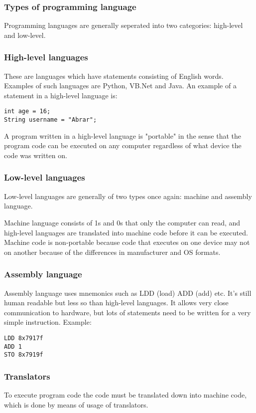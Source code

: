 \documentclass{article}
\begin{document}
\subsubsection{Types of programming language}
Programming languages are generally seperated into two categories: high-level and 
low-level.

\subsubsection*{High-level languages}
These are languages which have statements consisting of English words. Examples of such
languages are Python, VB.Net and Java. An example of a statement in a high-level language
is:
\begin{verbatim}
int age = 16;
String username = "Abrar";
\end{verbatim}
A program written in a high-level language is "portable" in the sense that the program
code can be executed on any computer regardless of what device the code was written on.

\subsubsection*{Low-level languages}
Low-level languages are generally of two types once again: machine and assembly language.

Machine language consists of 1s and 0s that only the computer can read, and high-level
languages are translated into machine code before it can be executed. Machine code is
non-portable because code that executes on one device may not on another because of the
differences in manufacturer and OS formats.

\subsubsection{Assembly language}
Assembly language uses mnemonics such as LDD (load) ADD (add) etc. It's still human
readable but less so than high-level languages. It allows very close communication to
hardware, but lots of statements need to be written for a very simple instruction.
Example:
\begin{verbatim}
LDD 8x7917f
ADD 1
STO 8x7919f
\end{verbatim}
\subsubsection{Translators}
To execute program code the code must be translated down into machine code, which is done
by means of usage of translators.
\end{document}
